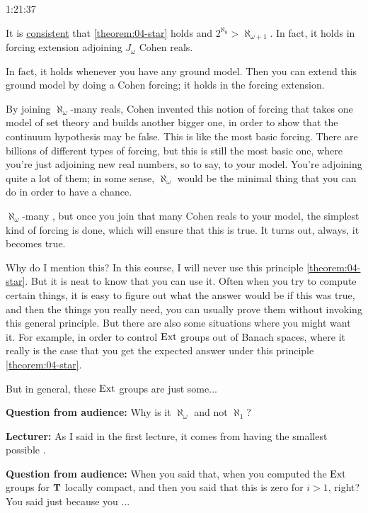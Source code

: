 \begin{unfinished}{1:21:37}
\begin{theorem}
It is \underline{consistent} that \ref{theorem:04-star} holds and $2^{\aleph_0} > \aleph_{\omega+1}$.
In fact, it holds in forcing extension adjoining $J_\omega$ Cohen reals.
\end{theorem}

In fact, it holds whenever you have any ground model. Then you can extend this ground model by doing a Cohen forcing; it holds in the forcing extension.

By joining $\aleph_\omega$-many reals,
Cohen invented this notion of forcing that takes one model of set theory and builds another bigger one, in order to show that the continuum hypothesis may be false. 
This is like the most basic forcing. There are billions of different types of forcing, but this is still the most basic one, where you're just adjoining new real numbers, so to say, to your model. You're adjoining quite a lot of them; in some sense, $\aleph_\omega$ would be the minimal thing that you can do in order to have a chance.

$\aleph_\omega$-many , but once you join that many Cohen reals to your model, the simplest kind of forcing is done, which will ensure that this is true. It turns out, always, it becomes true.

Why do I mention this? In this course, I will never use this principle \ref{theorem:04-star}. But it is neat to know that you can use it. Often when you try to compute certain things, it is easy to figure out what the answer would be if this was true, and then the things you really need, you can usually prove them without invoking this general principle.
But there are also some situations where you might want it. For example, in order to control $\operatorname{Ext}$ groups out of Banach spaces, where it really is the case that you get the expected answer under this principle \ref{theorem:04-star}.

But in general, these $\operatorname{Ext}$ groups are just some... 

%
\textbf{Question from audience:} Why is it $\aleph_\omega$ and not $\aleph_1$? 


\textbf{Lecturer:} As I said in the first lecture, it comes from having the smallest possible .

%
\textbf{Question from audience:} When you said that, when you computed the $\operatorname{Ext}$ groups for $\mathbf T$ locally compact, and then you said that this is zero for $i > 1$, right? You said just because you ...


\end{unfinished}
